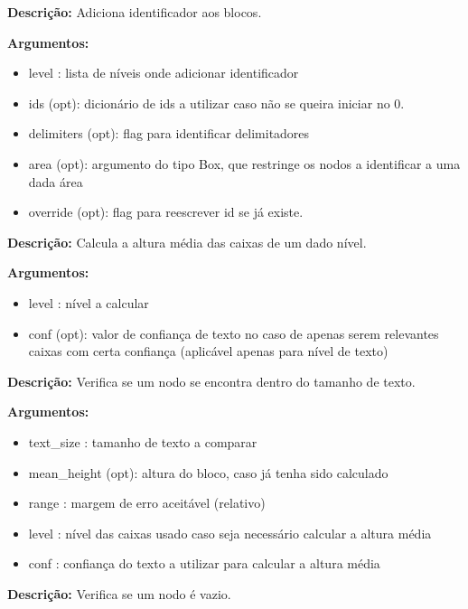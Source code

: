 
 
\textbf{Descrição:} Adiciona identificador aos blocos.
	
\textbf{Argumentos:}
	\begin{itemize}\setlength\itemsep{-0.3em}
		\item level : lista de níveis onde adicionar identificador
		\item ids (opt): dicionário de ids a utilizar caso não se queira iniciar no 0.
		\item delimiters (opt): flag para identificar delimitadores
		\item area (opt): argumento do tipo Box, que restringe os nodos a identificar a uma dada área
		\item override (opt): flag para reescrever id se já existe.
	\end{itemize}
				

\textbf{Descrição:} Calcula a altura média das caixas de um dado nível.
	
\textbf{Argumentos:}
\begin{itemize}\setlength\itemsep{-0.3em}
	\item level : nível a calcular
	\item conf (opt): valor de confiança de texto no caso de apenas serem relevantes caixas com certa confiança (aplicável apenas para nível de texto)
\end{itemize}

	

\textbf{Descrição:} Verifica se um nodo se encontra dentro do tamanho de texto.
	
\textbf{Argumentos:}
\begin{itemize}\setlength\itemsep{-0.3em}
	\item text\_size : tamanho de texto a comparar
	\item mean\_height (opt): altura do bloco, caso já tenha sido calculado
	\item range : margem de erro aceitável (relativo)
	\item level : nível das caixas usado caso seja necessário calcular a altura média
	\item conf : confiança do texto a utilizar para calcular a altura média
\end{itemize}


\textbf{Descrição:} Verifica se um nodo é vazio.
	
